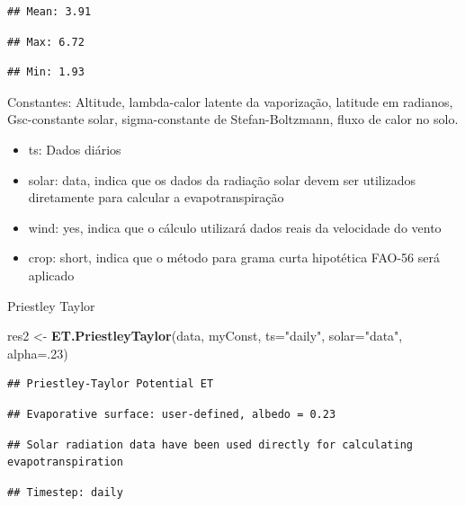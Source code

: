 \documentclass[
]{book}
\newenvironment{Shaded}{\begin{snugshade}}{\end{snugshade}}
\newcommand{\DataTypeTok}[1]{\textcolor[rgb]{0.13,0.29,0.53}{#1}}
\newcommand{\DecValTok}[1]{\textcolor[rgb]{0.00,0.00,0.81}{#1}}
\newcommand{\KeywordTok}[1]{\textcolor[rgb]{0.13,0.29,0.53}{\textbf{#1}}}
\newcommand{\NormalTok}[1]{#1}
\newcommand{\StringTok}[1]{\textcolor[rgb]{0.31,0.60,0.02}{#1}}
\providecommand{\tightlist}{%
  \setlength{\itemsep}{0pt}\setlength{\parskip}{0pt}}
\begin{document}
\begin{verbatim}
## Mean: 3.91
\end{verbatim}

\begin{verbatim}
## Max: 6.72
\end{verbatim}

\begin{verbatim}
## Min: 1.93
\end{verbatim}

Constantes: Altitude, lambda-calor latente da vaporização, latitude em radianos, Gsc-constante solar, sigma-constante de Stefan-Boltzmann, fluxo de calor no solo.

\begin{itemize}
\tightlist
\item
  ts: Dados diários
\item
  solar: data, indica que os dados da radiação solar devem ser utilizados diretamente para calcular a evapotranspiração
\item
  wind: yes, indica que o cálculo utilizará dados reais da velocidade do vento
\item
  crop: short, indica que o método para grama curta hipotética FAO-56 será aplicado
\end{itemize}

Priestley Taylor

\begin{Shaded}
\begin{Highlighting}[]
\NormalTok{res2 <-}\StringTok{ }\KeywordTok{ET.PriestleyTaylor}\NormalTok{(data, myConst, }\DataTypeTok{ts=}\StringTok{"daily"}\NormalTok{, }\DataTypeTok{solar=}\StringTok{"data"}\NormalTok{, }\DataTypeTok{alpha=}\NormalTok{.}\DecValTok{23}\NormalTok{)}
\end{Highlighting}
\end{Shaded}

\begin{verbatim}
## Priestley-Taylor Potential ET
\end{verbatim}

\begin{verbatim}
## Evaporative surface: user-defined, albedo = 0.23
\end{verbatim}

\begin{verbatim}
## Solar radiation data have been used directly for calculating evapotranspiration
\end{verbatim}

\begin{verbatim}
## Timestep: daily
\end{verbatim}
\end{document}
